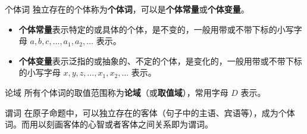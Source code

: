 
\begin{definition}{个体词}
独立存在的个体称为\textbf{个体词}，可以是\textbf{个体常量}或\textbf{个体变量}。
\begin{itemize}
\item \textbf{个体常量}表示特定的或具体的个体，是不变的，一般用带或不带下标的小写字母 $a, b, c, \dots, a_1, a_2, \dots$ 表示。
\item \textbf{个体变量}表示泛指的或抽象的、不定的个体，是变化的，一般用带或不带下标的小写字母 $x, y, z, \dots, x_1, x_2, \dots$ 表示。
\end{itemize}

\end{definition}
\begin{definition}{论域}
所有个体词的取值范围称为\textbf{论域}（或\textbf{取值域}），常用字母 $D$ 表示。
\end{definition}


\begin{definition}{谓词}
在原子命题中，可以独立存在的客体（句子中的主语、宾语等），成为个体词。而用以刻画客体的心智或者客体之间关系即为谓词。
\end{definition}

